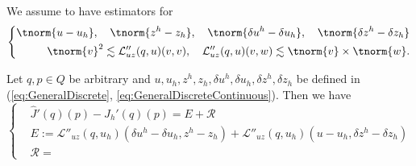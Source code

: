 %
We assume to have estimators for
%
\begin{equation}\label{eq:}
%
\left\{
\begin{aligned}
\tnorm{u-u_h},\quad \tnorm{z^h-z_h},\quad \tnorm{\delta u^h-\delta u_h},\quad \tnorm{\delta z^h-\delta z_h}\\
\tnorm{v}^2 \lesssim \mathcal L''_{uz}(q,u)(v,v),\quad \mathcal L''_{uz}(q,u)(v,w) \lesssim \tnorm{v}\times \tnorm{w}.
\end{aligned}
\right.
%
\end{equation}
%

\begin{proposition}\label{prop:}
%
Let $q,p\in Q$ be arbitrary and $u,u_h, z^h, z_h, \delta u^h,\delta u_h, \delta z^h,\delta z_h$ be defined in 
(\ref{eq:GeneralDiscrete}, \ref{eq:GeneralDiscreteContinuous}). Then we have
\begin{equation}\label{eq:}
%
\left\{
\begin{aligned}
&\hat J'(q)(p) - \hat J_h'(q)(p) = E + \mathcal R\\ 
&E := \mathcal L''_{uz}(q,u_h)(\delta u^h-\delta u_h, z^h - z_h) + \mathcal L''_{uz}(q,u_h)(u-u_h, \delta z^h-\delta z_h)\\
&\mathcal R =
\end{aligned}
\right.
%
\end{equation}
%
\end{proposition}
%
